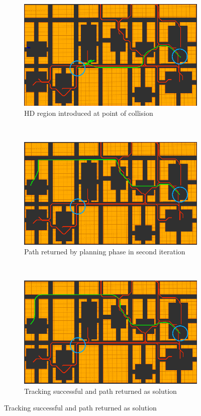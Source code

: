 \begin{figure}[ht]
  \begin{subfigure}[t]{0.3\linewidth}
    \centering
    \includegraphics[width=\linewidth]{Figures/alg4_c.png}
    \caption{HD region introduced at point of collision}
  \end{subfigure}
  ~
  \begin{subfigure}[t]{0.3\linewidth}
    \centering
    \includegraphics[width=\linewidth]{Figures/alg5_c.png}
    \caption{Path returned by planning phase in second iteration}
  \end{subfigure}
  ~
  \begin{subfigure}[t]{0.3\linewidth}
    \centering
    \includegraphics[width=\linewidth]{Figures/alg6_c.png}
    \caption{Tracking successful and path returned as solution}
  \end{subfigure}


\end{figure}

